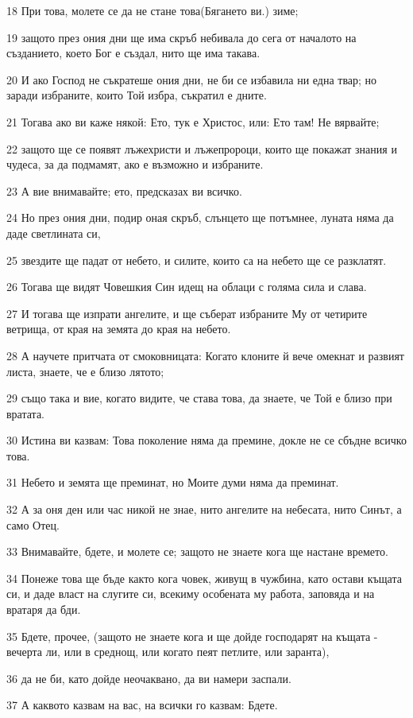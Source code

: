 \par 18 При това, молете се да не стане това(Бягането ви.) зиме;
\par 19 защото през ония дни ще има скръб небивала до сега от началото на създанието, което Бог е създал, нито ще има такава.
\par 20 И ако Господ не съкратеше ония дни, не би се избавила ни една твар; но заради избраните, които Той избра, съкратил е дните.
\par 21 Тогава ако ви каже някой: Ето, тук е Христос, или: Ето там! Не вярвайте;
\par 22 защото ще се появят лъжехристи и лъжепророци, които ще покажат знания и чудеса, за да подмамят, ако е възможно и избраните.
\par 23 А вие внимавайте; ето, предсказах ви всичко.
\par 24 Но през ония дни, подир оная скръб, слънцето ще потъмнее, луната няма да даде светлината си,
\par 25 звездите ще падат от небето, и силите, които са на небето ще се разклатят.
\par 26 Тогава ще видят Човешкия Син идещ на облаци с голяма сила и слава.
\par 27 И тогава ще изпрати ангелите, и ще съберат избраните Му от четирите ветрища, от края на земята до края на небето.
\par 28 А научете притчата от смоковницата: Когато клоните й вече омекнат и развият листа, знаете, че е близо лятото;
\par 29 също така и вие, когато видите, че става това, да знаете, че Той е близо при вратата.
\par 30 Истина ви казвам: Това поколение няма да премине, докле не се сбъдне всичко това.
\par 31 Небето и земята ще преминат, но Моите думи няма да преминат.
\par 32 А за оня ден или час никой не знае, нито ангелите на небесата, нито Синът, а само Отец.
\par 33 Внимавайте, бдете, и молете се; защото не знаете кога ще настане времето.
\par 34 Понеже това ще бъде както кога човек, живущ в чужбина, като остави къщата си, и даде власт на слугите си, всекиму особената му работа, заповяда и на вратаря да бди.
\par 35 Бдете, прочее, (защото не знаете кога и ще дойде господарят на къщата - вечерта ли, или в среднощ, или когато пеят петлите, или заранта),
\par 36 да не би, като дойде неочаквано, да ви намери заспали.
\par 37 А каквото казвам на вас, на всички го казвам: Бдете.

